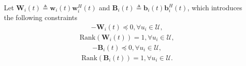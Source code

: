 \documentclass[10pt,journal,compsoc]{IEEEtran}
\newtheorem{lemma}{\textbf{Lemma}}
\newtheorem*{proof}{Proof}
\begin{document}
    

Let $\mathbf{W}_{i}(t) \triangleq \bm{w}_{i}(t)\bm{w}^{H}_{i}(t)$ and $\mathbf{B}_{i}(t) \triangleq \bm{b}_{i}(t)\bm{b}^{H}_{i}(t)$, which introduces the following constraints\cite{Solution: Rank-One-Penalty-1, Solution: Rank-One-Penalty-2}
\begin{align}\label{P2:Sen-Semi-Positive}
    -\mathbf{W}_{i}(t) \preceq   0, \forall u_{i} \in \mathcal{U},
\end{align}
\begin{align}\label{P2:Sen-Rank-1}
    \text{Rank}\left(\mathbf{W}_{i}(t)\right) = 1, \forall u_{i} \in \mathcal{U},
\end{align}
\begin{align}\label{P2:Off-Semi-Positive}
    -\mathbf{B}_{i}(t) \preceq  0, \forall u_{i} \in \mathcal{U},
\end{align}
\begin{align}\label{P2:Off-Rank-1}
    \text{Rank}\left(\mathbf{B}_{i}(t)\right) = 1, \forall u_{i} \in \mathcal{U}.
\end{align}
\end{document}
